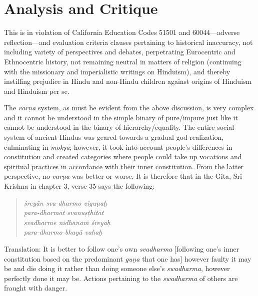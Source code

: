 \section*{Analysis and Critique} 

This is in violation of California Education Codes 51501 and 60044—adverse reflection—and evaluation criteria clauses pertaining to historical inaccuracy, not including variety of perspectives and debates, perpetrating Eurocentric and Ethnocentric history, not remaining neutral in matters of religion (continuing with the missionary and imperialistic writings on Hinduism), and thereby instilling prejudice in Hindu and non-Hindu children against origins of Hinduism and Hinduism per se.

The \textit{varṇa} system, as must be evident from the above discussion, is very complex and it cannot be understood in the simple binary of pure/impure just like it cannot be understood in the binary of hierarchy/equality. The entire social system of ancient Hindus was geared towards a gradual god realization, culminating in \textit{mokṣa}; however, it took into account people’s differences in constitution and created categories where people could take up vocations and spiritual practices in accordance with their inner constitution. From the latter perspective, no \textit{varṇa} was better or worse. It is therefore that in the Gita, Sri Krishna in chapter 3, verse 35 says the following: 

\begin{quote}
\textit{śreyān sva-dharmo viguṇaḥ}\\
\textit{para-dharmāt svanuṣṭhitāt}\\
\textit{svadharme nidhanaṁ śreyaḥ}\\
\textit{para-dharmo bhayā vahaḥ}
\end{quote}
Translation: It is better to follow one’s own \textit{svadharma}  [following one’s inner constitution based on the predominant \textit{guṇa} that one has] however faulty it may be and die doing it rather than doing someone else’s \textit{swadharma}, however perfectly done it may be. Actions pertaining to the \textit{swadharma} of others are fraught with danger. 

